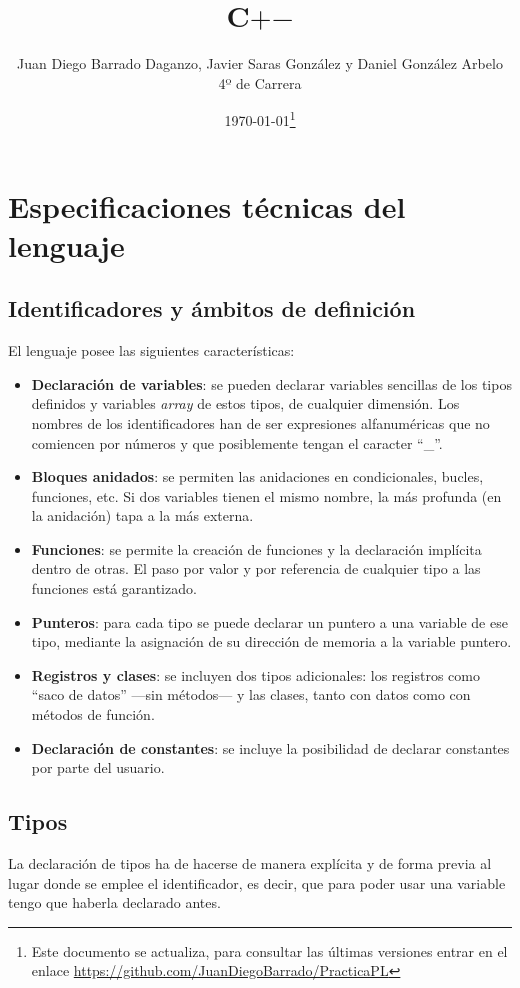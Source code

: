 \documentclass[10pt,a4paper]{article}
\title{\Huge C$+$$-$}
\author{Juan Diego Barrado Daganzo, Javier Saras González y Daniel González Arbelo \\ 4º de Carrera}
\date{\today\footnote{Este documento se actualiza, para consultar las últimas versiones entrar en el enlace \url{https://github.com/JuanDiegoBarrado/PracticaPL}}}
\begin{document}
\maketitle
\tableofcontents

\section{Especificaciones técnicas del lenguaje}
\subsection{Identificadores y ámbitos de definición}
El lenguaje posee las siguientes características:
\begin{itemize}
    \item \textbf{Declaración de variables}: se pueden declarar variables sencillas de los tipos definidos y variables \textit{array} de estos tipos, de cualquier dimensión. Los nombres de los identificadores han de ser expresiones alfanuméricas que no comiencen por números y que posiblemente tengan el caracter ``\_''.
    \item \textbf{Bloques anidados}: se permiten las anidaciones en condicionales, bucles, funciones, etc. Si dos variables tienen el mismo nombre, la más profunda (en la anidación) tapa a la más externa.
    \item \textbf{Funciones}: se permite la creación de funciones y la declaración implícita dentro de otras. El paso por valor y por referencia de cualquier tipo a las funciones está garantizado.
    \item \textbf{Punteros}: para cada tipo se puede declarar un puntero a una variable de ese tipo, mediante la asignación de su dirección de memoria a la variable puntero.
    \item \textbf{Registros y clases}: se incluyen dos tipos adicionales: los registros como ``saco de datos'' ---sin métodos--- y las clases, tanto con datos como con métodos de función.
    \item \textbf{Declaración de constantes}: se incluye la posibilidad de declarar constantes por parte del usuario.
\end{itemize}

\subsection{Tipos}
La declaración de tipos ha de hacerse de manera explícita y de forma previa al lugar donde se emplee el identificador, es decir, que para poder usar una variable tengo que haberla declarado antes.
\end{document}
